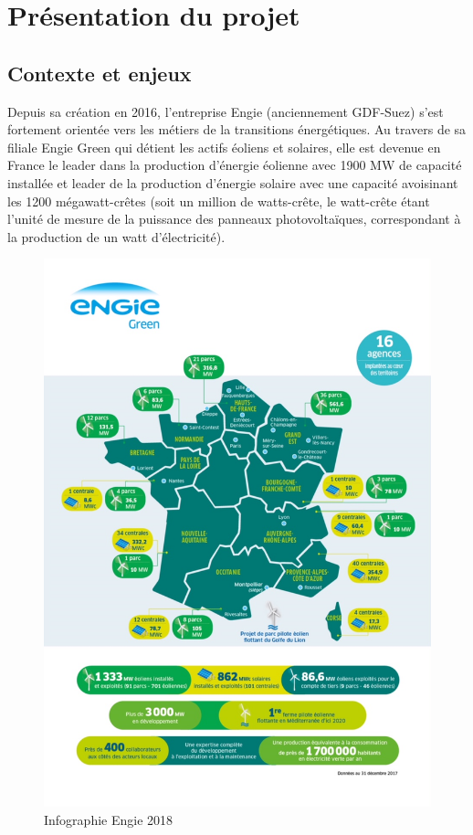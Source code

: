\chapter{Présentation du projet}

\section{Contexte et enjeux}
Depuis sa création en 2016, l'entreprise Engie (anciennement GDF-Suez) s'est fortement orientée vers les métiers de la transitions énergétiques. Au travers de sa filiale Engie Green qui détient les actifs éoliens et solaires, elle est devenue en France le leader dans la production d'énergie éolienne avec 1900 MW de capacité installée et leader de la production d'énergie solaire avec une capacité avoisinant les 1200 mégawatt-crêtes (soit un million de watts-crête,  le watt-crête étant l'unité de mesure de la puissance des panneaux photovoltaïques, correspondant à la production de un watt d'électricité).

\begin{figure}[!ht]
\begin{center} \includegraphics[scale=0.5]{rapport/images/Ch1_infog_engiegreen_2017.jpg} \end{center}
\caption{Infographie Engie 2018}
\end{figure}

